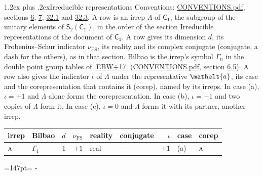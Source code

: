 \documentclass[10pt,a4paper]{article}
\makeatletter
\renewcommand\section{\@startsection{section}{1}{\z@}{-3ex plus -1ex minus -.2ex}%
  {1.2ex plus .2ex}{\normalfont\large\sffamily\bfseries\color{parttitle}}}
\newcommand{\needspace}[1]{\par\penalty-100\begingroup\dimen0=#1\relax\dimen2=\pagegoal
  \advance\dimen2-\pagetotal\ifdim\dimen0>\dimen2\relax\ifdim\dimen2>0pt\vfil\break\fi\fi
  \endgroup}
\numberwithin{equation}{section}
\newcommand{\eltfont}[1]{{\let\sigma\eltsigma\mathelt{#1}}}
\newcommand{\grp}[1]{\mathsf{#1}}
\newcommand{\irr}[1]{\text{\normalfont\scshape #1}}
\newcommand{\elt}[1]{\eltfont{#1}}
\newcommand{\fsind}{\nu_{\mathrm{FS}}}
\makeatother
\begin{document}
\section{Irreducible representations}\label{s:irreps}
Conventions: \href{../../CONVENTIONS.pdf}{CONVENTIONS.pdf}, sections \href{../../../rotation/CONVENTIONS.pdf\#conv.6}{6}, \href{../../../rotation/CONVENTIONS.pdf\#conv.7}{7}, \href{../../CONVENTIONS.pdf\#conv.32.1}{32.1} and \href{../../CONVENTIONS.pdf\#conv.32.3}{32.3}.
\leavevmode\label{n:irrep.Delta}A row is an irrep $\Lambda$ of $\grp{C_{1}}$, the subgroup of the unitary elements of $\grp{S_{2}}(\grp{C_{1}})$, in the order of the section Irreducible representations of the document of \href{../../../rotation/data/pdf/C1.pdf}{$\grp{C_{1}}$}. \label{n:index.dimension}\label{n:index.frobenius}\label{n:head.irrep}\label{n:head.reality}\label{n:head.conjugate}A row gives its dimension $d$, its Frobenius--Schur indicator $\fsind$, its reality and its complex conjugate (conjugate, a dash for the others), as in that section. \label{n:head.bilbao}\label{n:irrep.alias.gamma}Bilbao is the irrep's symbol $\Gamma_n$ in the double point group tables of [\href{../../../REFERENCES.pdf\#ref.EBW+17}{EBW+17}] (\href{../../CONVENTIONS.pdf}{CONVENTIONS.pdf}, section \href{../../../rotation/CONVENTIONS.pdf\#conv.6.5}{6.5}). \label{n:head.case.corep}\label{n:head.corep}A row also gives the indicator $\iota$ of $\Lambda$ under the representative $\elt{a}$, its case and the corepresentation that contains it (corep), named by its irreps. In case (a), $\iota = +1$ and $\Lambda$ alone forms the corepresentation. In case (b), $\iota = -1$ and two copies of $\Lambda$ form it. In case (c), $\iota = 0$ and $\Lambda$ forms it with its partner, another irrep.
\setlength{\emergencystretch}{2em}\par\setlength{\emergencystretch}{0pt}
{\small\renewcommand{\arraystretch}{1.25}\setlength{\tabcolsep}{4pt}\begin{longtable}{@{}llrrllrll@{}}\toprule
irrep & Bilbao & $d$ & $\fsind$ & reality & conjugate & $\iota$ & case & corep\\\midrule\endhead
\bottomrule\endfoot\endlastfoot
$\irr{a}$ & $\Gamma_{1}$ & 1 & $+1$ & real & --- & $+1$ & (a) & $\irr{a}$\\
\bottomrule\end{longtable}}
\needspace{147pt}
\end{document}
